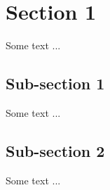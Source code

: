 \vspace{-0.8cm}
\noindent{}

\section{Section 1}
Some text ...

\subsection{Sub-section 1}
Some text ...

\subsection{Sub-section 2}
Some text ...